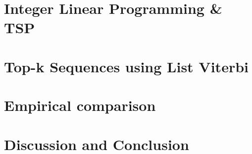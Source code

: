 \documentclass[sigconf]{acmart}
\begin{document}
\section{Integer Linear Programming \& TSP}
\label{sec:ilp}


\section{Top-k Sequences using List Viterbi}
\label{sec:viterbi}


%

\section{Empirical comparison}
\label{sec:experiments}


\section{Discussion and Conclusion}
\label{sec:discussion}




 
\end{document}
